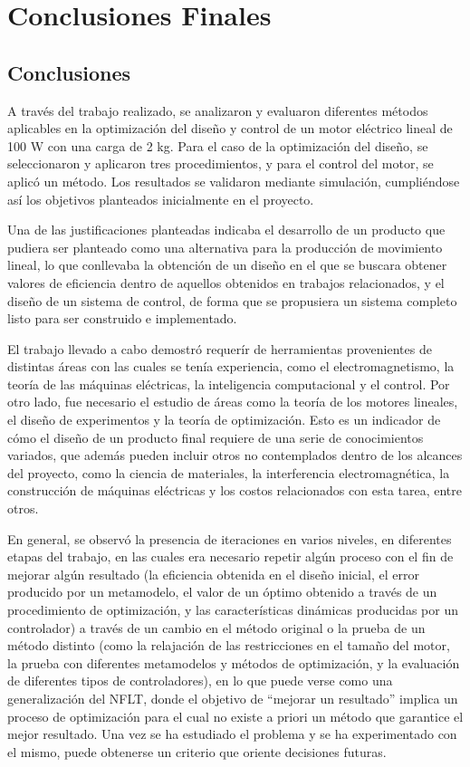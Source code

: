 \chapter{Conclusiones Finales}

\section{Conclusiones}

A través del trabajo realizado, se analizaron y evaluaron diferentes métodos aplicables en la optimización del diseño y control de un motor eléctrico lineal de 100 W con una carga de 2 kg. Para el caso de la optimización del diseño, se seleccionaron y aplicaron tres procedimientos, y para el control del motor, se aplicó un método. Los resultados se validaron mediante simulación, cumpliéndose así los objetivos planteados inicialmente en el proyecto.

Una de las justificaciones planteadas indicaba el desarrollo de un producto que pudiera ser planteado como una alternativa para la producción de movimiento lineal, lo que conllevaba la obtención de un diseño en el que se buscara obtener valores de eficiencia dentro de aquellos obtenidos en trabajos relacionados, y el diseño de un sistema de control, de forma que se propusiera un sistema completo listo para ser construido e implementado.

El trabajo llevado a cabo demostró requerír de herramientas provenientes de distintas áreas con las cuales se tenía experiencia, como el electromagnetismo, la teoría de las máquinas eléctricas, la inteligencia computacional y el control. Por otro lado, fue necesario el estudio de áreas como la teoría de los motores lineales, el diseño de experimentos y la teoría de optimización. Esto es un indicador de cómo el diseño de un producto final requiere de una serie de conocimientos variados, que además pueden incluir otros no contemplados dentro de los alcances del proyecto, como la ciencia de materiales, la interferencia electromagnética, la construcción de máquinas eléctricas y los costos relacionados con esta tarea, entre otros.

En general, se observó la presencia de iteraciones en varios niveles, en diferentes etapas del trabajo, en las cuales era necesario repetir algún proceso con el fin de mejorar algún resultado (la eficiencia obtenida en el diseño inicial, el error producido por un metamodelo, el valor de un óptimo obtenido a través de un procedimiento de optimización, y las características dinámicas producidas por un controlador) a través de un cambio en el método original o la prueba de un método distinto (como la relajación de las restricciones en el tamaño del motor, la prueba con diferentes metamodelos y métodos de optimización, y la evaluación de diferentes tipos de controladores), en lo que puede verse como una generalización del NFLT, donde el objetivo de ``mejorar un resultado'' implica un proceso de optimización para el cual no existe a priori un método que garantice el mejor resultado. Una vez se ha estudiado el problema y se ha experimentado con el mismo, puede obtenerse un criterio que oriente decisiones futuras.

